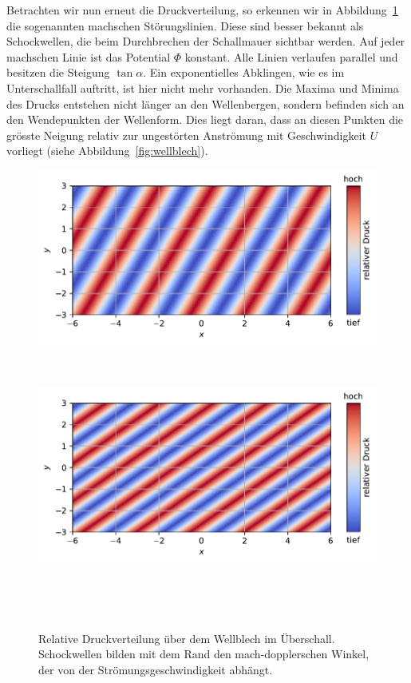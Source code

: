 Betrachten wir nun erneut die Druckverteilung, so erkennen wir in 
Abbildung~\ref{fig:druckvert_ueberschall} die sogenannten machschen Störungslinien. 
%
Diese sind besser bekannt als Schockwellen, 
%
die beim Durchbrechen der Schallmauer sichtbar werden. 
%
Auf jeder machschen Linie ist das Potential \(\Phi\) konstant. 
Alle Linien verlaufen parallel und besitzen die Steigung \(\tan \alpha\).
Ein exponentielles Abklingen, wie es im Unterschallfall auftritt, 
ist hier nicht mehr vorhanden. 
Die Maxima und Minima des Drucks entstehen nicht länger an den Wellenbergen, 
sondern befinden sich an den Wendepunkten der Wellenform. 
Dies liegt daran, dass an diesen Punkten die grösste Neigung relativ zur 
ungestörten Anströmung mit Geschwindigkeit \(U\) vorliegt 
(siehe Abbildung~\ref{fig:wellblech}).
\begin{figure}
    \centering
    \begin{minipage}[b]{\textwidth}
        \centering
        \includegraphics[width=\linewidth]{papers/ueberschall/figures/druck_mach_kegel_400.pdf}
        \caption*{$U = 400\,\frac{\mathrm{m}}{\mathrm{s}}$}
        ~\label{fig:druckvert_ueberschall_u400}
    \end{minipage}
    \hfill
    \begin{minipage}[b]{\textwidth}
        \centering
        \includegraphics[width=\linewidth]{papers/ueberschall/figures/druck_mach_kegel_600.pdf}
        \caption*{$U = 600\,\frac{\mathrm{m}}{\mathrm{s}}$}
        ~\label{fig:druckvert_ueberschall_u600}
    \end{minipage}
    \caption{Relative Druckverteilung über dem Wellblech im Überschall.
Schockwellen bilden mit dem Rand den mach-dopplerschen Winkel, der von der
Strömungsgeschwindigkeit abhängt.}
~\label{fig:druckvert_ueberschall}
\end{figure}
